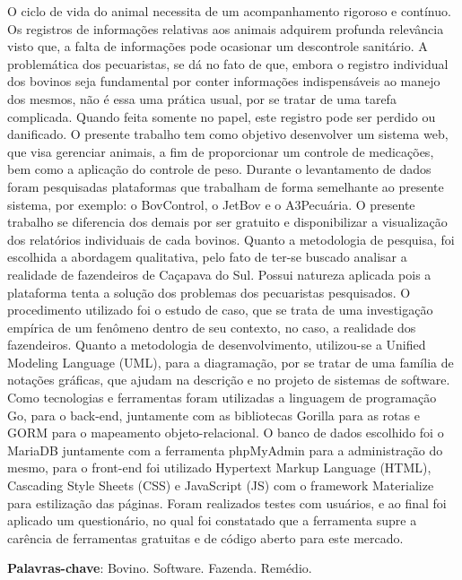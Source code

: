 %
%

\begin{RESUMO}
\thispagestyle{empty}
	\begin{SingleSpace}

		\hspace{-1.2 cm}  O ciclo de vida do animal necessita de um acompanhamento rigoroso e contínuo. Os registros de informações relativas aos animais adquirem profunda relevância visto que, a falta de informações pode ocasionar um descontrole sanitário. A problemática dos pecuaristas, se dá no fato de que, embora o registro individual dos bovinos seja fundamental por conter informações indispensáveis ao manejo dos mesmos, não é essa uma prática usual, por se tratar de uma tarefa  complicada. Quando feita somente no papel, este registro pode ser perdido ou danificado. O presente trabalho tem como objetivo desenvolver um sistema web, que visa gerenciar animais, a fim de proporcionar um controle de medicações, bem como a aplicação do controle de peso. Durante o levantamento de dados foram pesquisadas plataformas que trabalham de forma semelhante ao presente sistema, por exemplo: o BovControl, o JetBov e o A3Pecuária. O presente trabalho se diferencia dos demais por ser gratuito e disponibilizar a visualização dos relatórios individuais de cada bovinos. Quanto a metodologia de pesquisa, foi escolhida a abordagem qualitativa, pelo fato de ter-se buscado analisar a realidade de fazendeiros de Caçapava do Sul. Possui natureza aplicada pois a plataforma tenta a solução dos problemas dos pecuaristas pesquisados. O procedimento utilizado foi o estudo de caso, que se trata de uma investigação empírica de um fenômeno dentro de seu contexto, no caso, a realidade dos fazendeiros. Quanto a metodologia de desenvolvimento, utilizou-se a Unified Modeling Language (UML), para a diagramação, por se tratar de uma família de notações gráficas, que ajudam na descrição e no projeto de sistemas de software. Como tecnologias e ferramentas foram utilizadas a linguagem de programação Go, para o back-end, juntamente com as bibliotecas Gorilla para as rotas e GORM para o mapeamento objeto-relacional. O banco de dados escolhido foi o MariaDB juntamente com a ferramenta phpMyAdmin para a administração do mesmo, para o front-end foi utilizado Hypertext Markup Language (HTML), Cascading Style Sheets (CSS) e JavaScript (JS) com o framework Materialize para estilização das páginas. Foram realizados testes com usuários, e ao final foi aplicado um questionário, no qual foi constatado que a ferramenta supre a carência de ferramentas gratuitas e de código aberto para este mercado.

		\vspace*{0.5cm}\hspace{-1.3 cm}\textbf{Palavras-chave}: Bovino. Software. Fazenda. Remédio.

	\end{SingleSpace}

\end{RESUMO}
